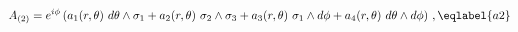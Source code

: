 \begin{equation}
A_{(2)}=e^{i\phi}\left(a_1(r,\theta)\ d\theta\wedge \sigma_1+a_2(r,\theta)\
 \sigma_2
\wedge \sigma_3+a_3(r,\theta)\ \sigma_1\wedge d\phi+a_4(r,\theta)\ 
d\theta\wedge d\phi\right)\,,
\eqlabel{a2}  
\end{equation}

